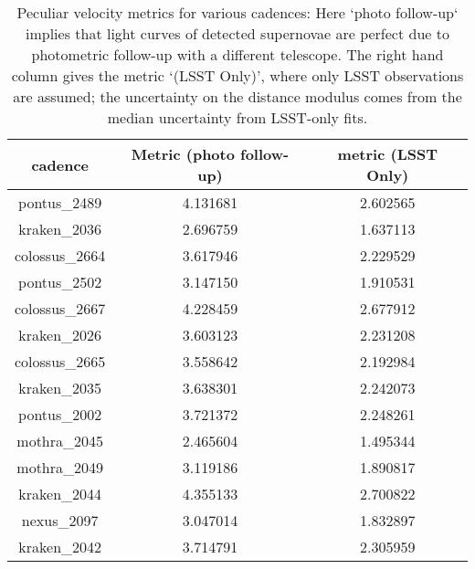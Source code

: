 \begin{table}
\begin{centering}
\begin{tabular}{|c|c|c|}
    \hline
     cadence &  Metric (photo follow-up) &  metric (LSST Only) \\
     \hline
     pontus\_2489 &         4.131681 &     2.602565 \\
     kraken\_2036 &         2.696759 &     1.637113 \\
   colossus\_2664 &         3.617946 &     2.229529 \\
     pontus\_2502 &         3.147150 &     1.910531 \\
   colossus\_2667 &         4.228459 &     2.677912 \\
     kraken\_2026 &         3.603123 &     2.231208 \\
   colossus\_2665 &         3.558642 &     2.192984 \\
     kraken\_2035 &         3.638301 &     2.242073 \\
     pontus\_2002 &         3.721372 &     2.248261 \\
     mothra\_2045 &         2.465604 &     1.495344 \\
     mothra\_2049 &         3.119186 &     1.890817 \\
     kraken\_2044 &         4.355133 &     2.700822 \\
      nexus\_2097 &         3.047014 &     1.832897 \\
     kraken\_2042 &         3.714791 &     2.305959 \\
     \hline
\end{tabular}
\end{centering}
\caption{Peculiar velocity metrics for various cadences: Here `photo follow-up` implies that light curves of detected supernovae are perfect due to photometric follow-up with a different telescope. The right hand column gives the metric `(LSST Only)', where only LSST observations are assumed; the uncertainty on the distance modulus comes from the median uncertainty from LSST-only fits.}
\label{tab:cadence_metrics}
\end{table}
